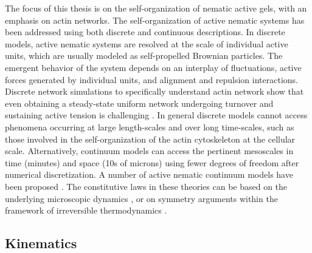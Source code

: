 The focus of this thesis is on the self-organization of nematic active gels, with an emphasis on actin networks. The self-organization of active nematic systems has been addressed using both discrete and continuous descriptions. In discrete models, \cite{bechinger2016, patelli2019, alaimo2017, ehrig2017,keber2014,khoromskaia2017,ellis2018} active nematic systems are resolved at the scale of individual active units, which are usually modeled as self-propelled Brownian particles. The emergent behavior of the system depends on an interplay of fluctuations, active forces generated by individual units, and  alignment and repulsion interactions. Discrete network simulations to specifically understand actin network show that  even obtaining a steady-state uniform network undergoing turnover and sustaining active tension is challenging \cite{freedman2018,li2017,yu2018,mak2016, hiraiwa2016, miller2018}. In general discrete models cannot access phenomena occurring at large length-scales and over long time-scales, such as those involved in the self-organization of the actin cytoskeleton at the cellular scale. Alternatively, continuum models can access the pertinent  mesoscales in time (minutes) and space (10s of microns) using fewer degrees of freedom after numerical discretization. A number of active nematic continuum models have been proposed \cite{vcopar2019,zhang2020, napoli2020,pearce2020,nestler2018,hemingway2016,metselaar2019}. The constitutive laws in these theories can be based on the underlying microscopic dynamics \cite{patelli2019,bertin2013,peshkov2012,doi:10.1126/science.aao5434,Denk:2020vm}, or on symmetry arguments within the framework of  irreversible thermodynamics \cite{simha2002,hatwalne2004,julicher2018, salbreux2022}.

\subsection{Kinematics}

